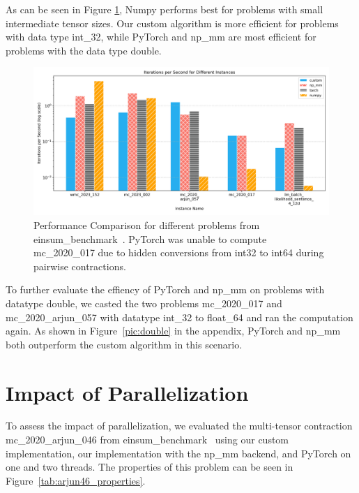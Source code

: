 \sloppy
\noindent As can be seen in Figure \ref{e_b}, Numpy performs best for problems with small intermediate tensor sizes. Our custom algorithm is more efficient for problems with data type int\_32, while PyTorch and np\_mm are most efficient for problems with the data type double.
\begin{figure}[H]
    \centering
    \includegraphics[width=1\textwidth]{images/einsum_five.png} 
    \caption{Performance Comparison for different problems from einsum\_benchmark~\cite{blacher2024einsum}. PyTorch was unable to compute mc\_2020\_017 due to hidden conversions from int32 to int64 during pairwise contractions.}
    \label{e_b}
\end{figure}

\noindent To further evaluate the effiency of PyTorch and np\_mm on problems with datatype double, we casted the two problems mc\_2020\_017 and mc\_2020\_arjun\_057 with datatype int\_32 to float\_64 and ran the computation again. As shown in Figure~\ref{pic:double} in the appendix, PyTorch and np\_mm both outperform the custom algorithm in this scenario.

\section{Impact of Parallelization}

\noindent To assess the impact of parallelization, we evaluated the multi-tensor contraction mc\_2020\_arjun\_046 from einsum\_benchmark~\cite{blacher2024einsum} using our custom implementation, our implementation with the np\_mm backend, and PyTorch on one and two threads. The properties of this problem can be seen in Figure~\ref{tab:arjun46_properties}. 

